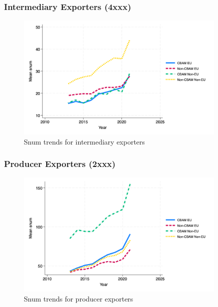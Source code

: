 \documentclass{article}
\begin{document}
\subsubsection{Intermediary Exporters (4xxx)}
\begin{figure}[h!]
\centering
\includegraphics[width=0.9\textwidth]{snum_ei.png}
\caption{Snum trends for intermediary exporters}
\label{fig:snum_ei}
\end{figure}

\subsubsection{Producer Exporters (2xxx)}
\begin{figure}[h!]
\centering
\includegraphics[width=0.9\textwidth]{snum_ep.png}
\caption{Snum trends for producer exporters}
\label{fig:snum_ep}
\end{figure}
\end{document}
